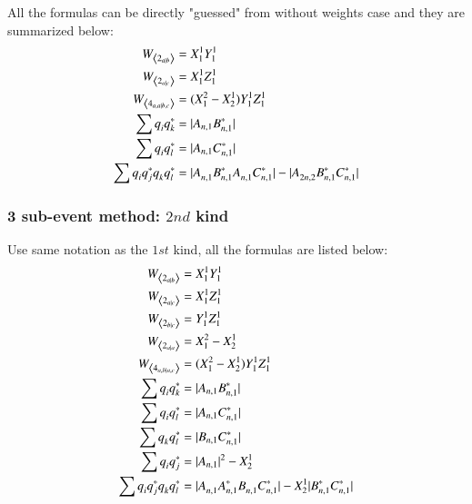 All the formulas can be directly "guessed" from without weights case and they are summarized below:
\begin{equation}
\begin{split}
W_{\left\langle 2_{a|b}\right\rangle} &= X_{1}^{1}Y_{1}^{1} \\
W_{\left\langle 2_{a|c}\right\rangle} &= X_{1}^{1}Z_{1}^{1} \\
W_{\left\langle 4_{a,a|b,c}\right\rangle} &= (X_{1}^{2}-X_{2}^{1})Y_{1}^{1}Z_{1}^{1} \\
\sum q_{i}^{}q_{k}^{*} &= |A_{n,1}B_{n,1}^{*}| \\
\sum q_{i}^{}q_{l}^{*} &= |A_{n,1}C_{n,1}^{*}| \\
\sum q_{i}^{}q_{j}^{*}q_{k}^{}q_{l}^{*} &= |A_{n,1}^{}B_{n,1}^{*}A_{n,1}^{}C_{n,1}^{*}|-|A_{2n,2}^{}B_{n,1}^{*}C_{n,1}^{*}|
\end{split}
\end{equation}

\subsubsection{3 sub-event method: $2nd$ kind}
Use same notation as the $1st$ kind, all the formulas are listed below:
\begin{equation}
\begin{split}
W_{\left\langle 2_{a|b}\right\rangle} &= X_{1}^{1}Y_{1}^{1} \\
W_{\left\langle 2_{a|c}\right\rangle} &= X_{1}^{1}Z_{1}^{1} \\
W_{\left\langle 2_{b|c}\right\rangle} &= Y_{1}^{1}Z_{1}^{1} \\
W_{\left\langle 2_{a|a}\right\rangle} &= X_{1}^{2}-X_{2}^{1} \\
W_{\left\langle 4_{a,b|a,c}\right\rangle} &= (X_{1}^{2}-X_{2}^{1})Y_{1}^{1}Z_{1}^{1} \\
\sum q_{i}^{}q_{k}^{*} &= |A_{n,1}B_{n,1}^{*}| \\
\sum q_{i}^{}q_{l}^{*} &= |A_{n,1}C_{n,1}^{*}| \\
\sum q_{k}^{}q_{l}^{*} &= |B_{n,1}C_{n,1}^{*}| \\
\sum q_{i}^{}q_{j}^{*} &= |A_{n,1}|^{2}-X_{2}^{1} \\
\sum q_{i}^{}q_{j}^{*}q_{k}^{}q_{l}^{*} &= |A_{n,1}^{}A_{n,1}^{*}B_{n,1}^{}C_{n,1}^{*}|-X_{2}^{1}|B_{n,1}^{*}C_{n,1}^{*}|
\end{split}
\end{equation}



